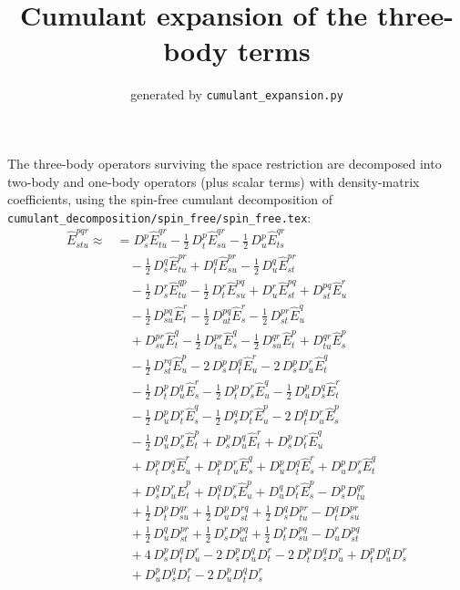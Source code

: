 \documentclass[11pt]{article}
\title{Cumulant expansion of the three-body terms}
\date{generated by \texttt{cumulant\_expansion.py}}
\begin{document}
\maketitle

The three-body operators surviving the space restriction are decomposed into two-body and one-body operators (plus scalar terms) with density-matrix coefficients, using the spin-free cumulant decomposition of \texttt{cumulant\_decomposition/spin\_free/spin\_free.tex}:
\begin{align}
\hat{E}^{pqr}_{stu} \approx &= D^{p}_{s} \hat{E}^{qr}_{tu} - \tfrac{1}{2}\, D^{p}_{t} \hat{E}^{qr}_{su} - \tfrac{1}{2}\, D^{p}_{u} \hat{E}^{qr}_{ts} \\
&\quad - \tfrac{1}{2}\, D^{q}_{s} \hat{E}^{pr}_{tu} + D^{q}_{t} \hat{E}^{pr}_{su} - \tfrac{1}{2}\, D^{q}_{u} \hat{E}^{pr}_{st} \\
&\quad - \tfrac{1}{2}\, D^{r}_{s} \hat{E}^{qp}_{tu} - \tfrac{1}{2}\, D^{r}_{t} \hat{E}^{pq}_{su} + D^{r}_{u} \hat{E}^{pq}_{st} + D^{pq}_{st} \hat{E}^{r}_{u} \\
&\quad - \tfrac{1}{2}\, D^{pq}_{su} \hat{E}^{r}_{t} - \tfrac{1}{2}\, D^{pq}_{ut} \hat{E}^{r}_{s} - \tfrac{1}{2}\, D^{pr}_{st} \hat{E}^{q}_{u} \\
&\quad + D^{pr}_{su} \hat{E}^{q}_{t} - \tfrac{1}{2}\, D^{pr}_{tu} \hat{E}^{q}_{s} - \tfrac{1}{2}\, D^{qr}_{su} \hat{E}^{p}_{t} + D^{qr}_{tu} \hat{E}^{p}_{s} \\
&\quad - \tfrac{1}{2}\, D^{rq}_{st} \hat{E}^{p}_{u} - 2\, D^{p}_{s} D^{q}_{t} \hat{E}^{r}_{u} - 2\, D^{p}_{s} D^{r}_{u} \hat{E}^{q}_{t} \\
&\quad - \tfrac{1}{2}\, D^{p}_{t} D^{q}_{u} \hat{E}^{r}_{s} - \tfrac{1}{2}\, D^{p}_{t} D^{r}_{s} \hat{E}^{q}_{u} - \tfrac{1}{2}\, D^{p}_{u} D^{q}_{s} \hat{E}^{r}_{t} \\
&\quad - \tfrac{1}{2}\, D^{p}_{u} D^{r}_{t} \hat{E}^{q}_{s} - \tfrac{1}{2}\, D^{q}_{s} D^{r}_{t} \hat{E}^{p}_{u} - 2\, D^{q}_{t} D^{r}_{u} \hat{E}^{p}_{s} \\
&\quad - \tfrac{1}{2}\, D^{q}_{u} D^{r}_{s} \hat{E}^{p}_{t} + D^{p}_{s} D^{q}_{u} \hat{E}^{r}_{t} + D^{p}_{s} D^{r}_{t} \hat{E}^{q}_{u} \\
&\quad + D^{p}_{t} D^{q}_{s} \hat{E}^{r}_{u} + D^{p}_{t} D^{r}_{u} \hat{E}^{q}_{s} + D^{p}_{u} D^{q}_{t} \hat{E}^{r}_{s} + D^{p}_{u} D^{r}_{s} \hat{E}^{q}_{t} \\
&\quad + D^{q}_{s} D^{r}_{u} \hat{E}^{p}_{t} + D^{q}_{t} D^{r}_{s} \hat{E}^{p}_{u} + D^{q}_{u} D^{r}_{t} \hat{E}^{p}_{s} - D^{p}_{s} D^{qr}_{tu}  \\
&\quad + \tfrac{1}{2}\, D^{p}_{t} D^{qr}_{su}  + \tfrac{1}{2}\, D^{p}_{u} D^{rq}_{st}  + \tfrac{1}{2}\, D^{q}_{s} D^{pr}_{tu}  - D^{q}_{t} D^{pr}_{su}  \\
&\quad + \tfrac{1}{2}\, D^{q}_{u} D^{pr}_{st}  + \tfrac{1}{2}\, D^{r}_{s} D^{pq}_{ut}  + \tfrac{1}{2}\, D^{r}_{t} D^{pq}_{su}  - D^{r}_{u} D^{pq}_{st}  \\
&\quad + 4\, D^{p}_{s} D^{q}_{t} D^{r}_{u}  - 2\, D^{p}_{s} D^{q}_{u} D^{r}_{t}  - 2\, D^{p}_{t} D^{q}_{s} D^{r}_{u}  + D^{p}_{t} D^{q}_{u} D^{r}_{s}  \\
&\quad + D^{p}_{u} D^{q}_{s} D^{r}_{t}  - 2\, D^{p}_{u} D^{q}_{t} D^{r}_{s} 
\end{align}
\end{document}
